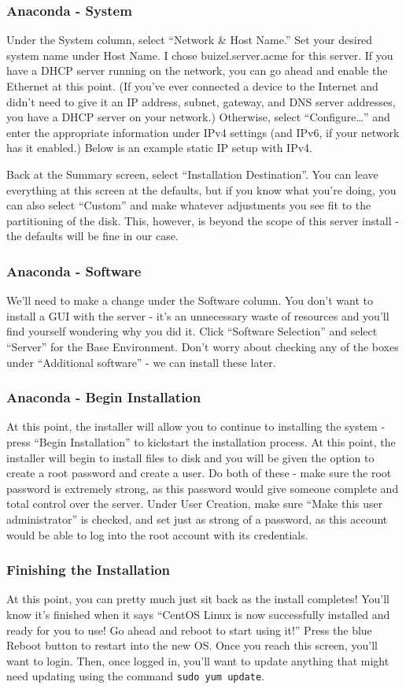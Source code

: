 \subsubsection{Anaconda - System}
Under the System column, select “Network \& Host Name.” Set your desired system name under Host Name. I chose buizel.server.acme for this server. If you have a DHCP server running on the network, you can go ahead and enable the Ethernet at this point. (If you’ve ever connected a device to the Internet and didn’t need to give it an IP address, subnet, gateway, and DNS server addresses, you have a DHCP server on your network.) Otherwise, select “Configure…” and enter the appropriate information under IPv4 settings (and IPv6, if your network has it enabled.) Below is an example static IP setup with IPv4.

Back at the Summary screen, select “Installation Destination”. You can leave everything at this screen at the defaults, but if you know what you’re doing, you can also select “Custom” and make whatever adjustments you see fit to the partitioning of the disk. This, however, is beyond the scope of this server install - the defaults will be fine in our case.

\subsubsection{Anaconda - Software}
We’ll need to make a change under the Software column. You don’t want to install a GUI with the server - it’s an unnecessary waste of resources and you’ll find yourself wondering why you did it. Click “Software Selection” and select “Server” for the Base Environment. Don’t worry about checking any of the boxes under “Additional software” - we can install these later.

\subsubsection{Anaconda - Begin Installation}
At this point, the installer will allow you to continue to installing the system - press “Begin Installation” to kickstart the installation process. At this point, the installer will begin to install files to disk and you will be given the option to create a root password and create a user. Do both of these - make sure the root password is extremely strong, as this password would give someone complete and total control over the server. Under User Creation, make sure “Make this user administrator” is checked, and set just as strong of a password, as this account would be able to log into the root account with its credentials.
\subsubsection{Finishing the Installation}
At this point, you can pretty much just sit back as the install completes! You’ll know it’s finished when it says “CentOS Linux is now successfully installed and ready for you to use! Go ahead and reboot to start using it!” Press the blue Reboot button to restart into the new OS.
Once you reach this screen, you’ll want to login.
Then, once logged in, you’ll want to update anything that might need updating using the command \verb|sudo yum update|.